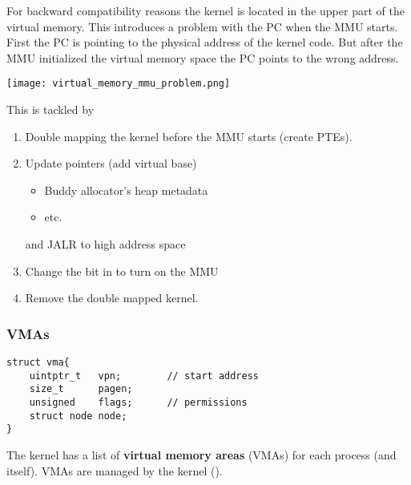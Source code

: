 For backward compatibility reasons the kernel is located in the upper part of the virtual memory. This introduces a problem with the PC when the MMU starts. First the PC is pointing to the physical address of the kernel code. But after the MMU initialized the virtual memory space the PC points to the wrong address.

\begin{center}
    \texttt{[image: virtual\_memory\_mmu\_problem.png]}
\end{center}

This is tackled by
\begin{enumerate}
    \item Double mapping the kernel before the MMU starts (create PTEs).
    \item Update pointers (add virtual base)
          \begin{itemize}
              \item Buddy allocator's heap metadata
              \item {} etc.\
          \end{itemize}
          and JALR to high address space
    \item Change the  bit in   to turn on the MMU
    \item Remove the double mapped kernel.
\end{enumerate}

\subsubsection{VMAs}
\ptitle{Data Structure}
\begin{lstlisting}[style=bright_C++]
struct vma{
    uintptr_t   vpn;        // start address
    size_t      pagen;
    unsigned    flags;      // permissions
    struct node node;
}
\end{lstlisting}

The kernel has a list of \textbf{virtual memory areas} (VMAs) for each process (and itself). VMAs are managed by the kernel ().

